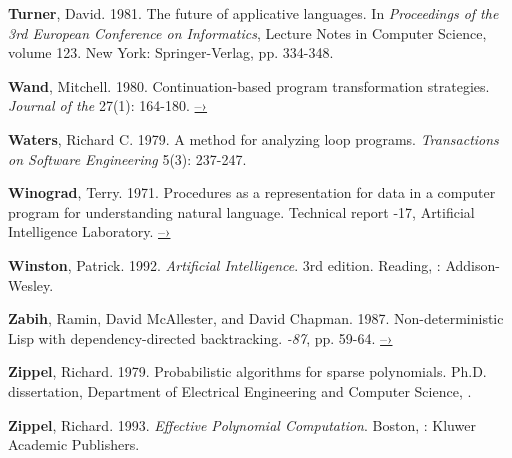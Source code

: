 { \label{Turner 1981}
\textbf{Turner}, David.  1981.  The future of applicative languages.  In
\textit{Proceedings of the 3rd European Conference on Informatics},
Lecture Notes
in Computer Science, volume 123. New York: Springer-Verlag, pp.  334-348.

 \label{Wand 1980}
\textbf{Wand}, Mitchell.  1980.  Continuation-based program
transformation strategies.
\textit{Journal of the } 27(1): 164-180.
\href{http://www.diku.dk/OLD/undervisning/2005e/224/papers/Wand80.pdf}{–›}

 \label{Waters (1979)}
\textbf{Waters}, Richard C.  1979.  A method for analyzing loop programs.
\textit{ Transactions on Software Engineering} 5(3): 237-247.

\textbf{Winograd}, Terry.  1971.  Procedures as a representation
for data in a computer
program for understanding natural language.  Technical report
-17,
 Artificial Intelligence Laboratory.
\href{http://dspace.mit.edu/handle/1721.1/7095}{–›}

 \label{Winston 1992}
\textbf{Winston}, Patrick. 1992. \textit{Artificial Intelligence}.
3rd edition.  Reading,
: Addison-Wesley.

 \label{Zabih et al. 1987}
\textbf{Zabih}, Ramin, David McAllester, and David Chapman.  1987.
Non-deterministic
Lisp with dependency-directed backtracking.  \textit{-87},
pp. 59-64.
\href{http://www.aaai.org/Papers/AAAI/1987/AAAI87-011.pdf}{–›}

 \label{Zippel (1979)}
\textbf{Zippel}, Richard.  1979.  Probabilistic algorithms for
sparse polynomials.
Ph.D. dissertation, Department of Electrical Engineering and Computer Science,
.

 \label{Zippel 1993}
\textbf{Zippel}, Richard.  1993.  \textit{Effective Polynomial
Computation}.  Boston, :
Kluwer Academic Publishers.
}

